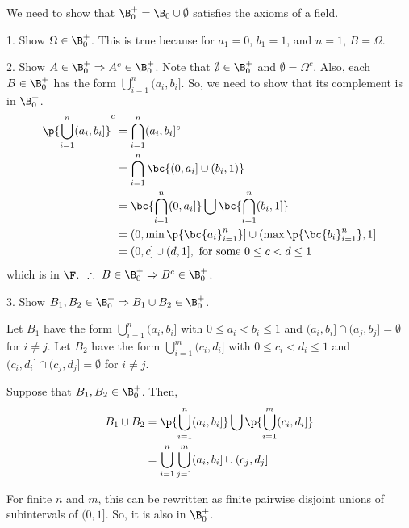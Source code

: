 
We need to show that $\B_0^+ = \B_0 \cup \emptyset$ satisfies the axioms of a field.


1. Show $\Omega \in \B_0^+$. This is true because for $a_1=0$, $b_1=1$, and
$n=1$, $B=\Omega$.

2. Show $A \in \B_0^+ \Rightarrow A^c \in \B_0^+$. 
Note that $\emptyset \in \B_0^+$ and $\emptyset = \Omega^c$.
Also, each $B \in \B_0^+$ has the form $\bigcup_{i=1}^n (a_i,b_i]$.
So, we need to show that its complement is in $\B_0^+$.
\begin{align*}
\p{\bigcup_{i=1}^n (a_i,b_i]}^c &= \bigcap_{i=1}^n (a_i,b_i]^c \\
                                     &= \bigcap_{i=1}^n \bc{(0,a_i]\cup (b_i,1)} \\
                                     &= \bc{\bigcap_{i=1}^n (0,a_i]} \bigcup 
                                        \bc{\bigcap_{i=1}^n (b_i,1]} \\
                                      &= (0,\min\p{{\bc{a_i}_{i=1}^n}}] \cup
                                         (\max\p{{\bc{b_i}_{i=1}^n}}, 1] \\
                                   &= (0,c] \cup (d,1], \text{ for some } 0 \le c < d \le 1 \\
\end{align*}
which is in $\F$.  $~\therefore~ B \in \B_0^+ \Rightarrow B^c \in \B_0^+$.

3. Show $B_1, B_2 \in \B_0^+ \Rightarrow B_1 \cup B_2 \in \B_0^+$.

Let $B_1$ have the form $\bigcup_{i=1}^n (a_i,b_i]$ with $0 \le a_i < b_i \le 1$
and $(a_i,b_i] \cap (a_j,b_j] = \emptyset$ for $i\ne j$.
Let $B_2$ have the form $\bigcup_{i=1}^m (c_i,d_i]$ with $0 \le c_i < d_i \le 1$
and $(c_i,d_i] \cap (c_j,d_j] = \emptyset$ for $i\ne j$.

Suppose that $B_1, B_2 \in \B_0^+$. Then,
\begin{align*}
  B_1 \cup B_2 &= \p{\bigcup_{i=1}^n (a_i,b_i]} \bigcup 
                  \p{\bigcup_{i=1}^m (c_i,d_i]} \\
               &= \bigcup_{i=1}^n \bigcup_{j=1}^m (a_i,b_i]\cup (c_j,d_j]
\end{align*}

For finite $n$ and $m$, this can be rewritten as finite pairwise disjoint unions
of subintervals of $(0,1]$. So, it is also in $\B_0^+$.

